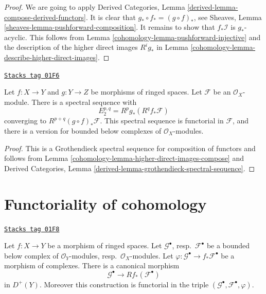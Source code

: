 \begin{proof}

We are going to apply
Derived Categories, Lemma \ref{derived-lemma-compose-derived-functors}.
It is clear that $g_* \circ f_* = (g \circ f)_*$, see
Sheaves, Lemma \ref{sheaves-lemma-pushforward-composition}.
It remains to show that $f_*\mathcal{I}$ is $g_*$-acyclic.
This follows from Lemma \ref{cohomology-lemma-pushforward-injective}
and the description of the
higher direct images $R^ig_*$ in
Lemma \ref{cohomology-lemma-describe-higher-direct-images}.
\end{proof}

\begin{lemma}

\label{cohomology-lemma-relative-Leray}
\href{https://stacks.math.columbia.edu/tag/01F6}{\texttt{Stacks tag 01F6}}

Let $f : X \to Y$ and $g : Y \to Z$ be morphisms of ringed spaces.
Let $\mathcal{F}$ be an $\mathcal{O}_X$-module.
There is a spectral sequence with
$$
E_2^{p, q} = R^pg_*(R^qf_*\mathcal{F})
$$
converging to $R^{p + q}(g \circ f)_*\mathcal{F}$.
This spectral sequence is functorial in $\mathcal{F}$, and there
is a version for bounded below complexes of $\mathcal{O}_X$-modules.
\end{lemma}

\begin{proof}

This is a Grothendieck spectral sequence for composition of functors
and follows from Lemma \ref{cohomology-lemma-higher-direct-images-compose} and
Derived Categories, Lemma \ref{derived-lemma-grothendieck-spectral-sequence}.
\end{proof}

\section{Functoriality of cohomology}
\label{cohomology-section-functoriality}
\begin{lemma}[Functoriality]
\label{cohomology-lemma-functoriality}
\href{https://stacks.math.columbia.edu/tag/01F8}{\texttt{Stacks tag 01F8}}

Let $f : X \to Y$ be a morphism of ringed spaces.
Let $\mathcal{G}^\bullet$, resp.\ $\mathcal{F}^\bullet$ be
a bounded below complex of $\mathcal{O}_Y$-modules,
resp.\ $\mathcal{O}_X$-modules. Let
$\varphi : \mathcal{G}^\bullet \to f_*\mathcal{F}^\bullet$
be a morphism of complexes. There is a canonical morphism
$$
\mathcal{G}^\bullet
\longrightarrow
Rf_*(\mathcal{F}^\bullet)
$$
in $D^{+}(Y)$. Moreover this construction is functorial in the triple
$(\mathcal{G}^\bullet, \mathcal{F}^\bullet, \varphi)$.
\end{lemma}

